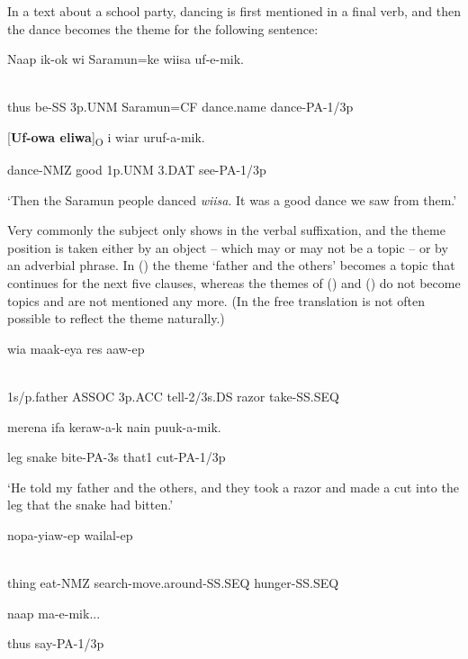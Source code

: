 In a text about a school party, dancing is first mentioned in a final verb, and then the dance becomes the theme for the following sentence:

\ea%
\label{ex:x1702}
\gll Naap  ik-ok  wi  Saramun=ke  wiisa  uf-e-mik. \\
      \\
\glt
\z

thus  be-SS  3p.UNM  Saramun=CF  dance.name  dance-PA-1/3p

[\textbf{Uf-owa  eliwa}]\textsubscript{O}  i  wiar  uruf-a-mik.

dance-NMZ  good  1p.UNM  3.DAT  see-PA-1/3p

`Then the Saramun people danced \textit{wiisa}. It was a good dance we saw from them.'

Very commonly the subject only shows in the verbal suffixation, and the theme position is taken either by an object -- which may or may not be a topic -- or by an adverbial phrase. In () the theme  `father and the others' becomes a topic that continues for the next five clauses, whereas the themes of () and () do not become topics and are not mentioned any more. (In the free translation is not often possible to reflect the theme naturally.)

\ea%
\label{ex:x1909}
\gll {}    wia  maak-eya  res  aaw-ep  \\
      \\
\glt
\z

1s/p.father  ASSOC  3p.ACC  tell-2/3s.DS  razor  take-SS.SEQ  

merena  ifa  keraw-a-k  nain  puuk-a-mik.

leg  snake  bite-PA-3s  that1  cut-PA-1/3p

`He told my father and the others, and they took  a razor and made a cut into the leg that the snake had bitten.'

\ea%
\label{ex:x1910}
\gll {}    nopa-yiaw-ep  wailal-ep  \\
      \\
\glt
\z

thing  eat-NMZ  search-move.around-SS.SEQ  hunger-SS.SEQ  

naap  ma-e-mik...

thus  say-PA-1/3p

